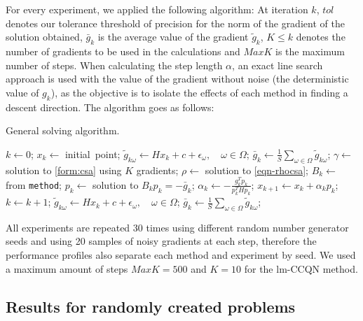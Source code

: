 \documentclass[11pt,twoside]{article}
\begin{document}
For every experiment, we applied the following algorithm: At iteration $k$, $tol$ denotes our tolerance threshold of precision for the norm of the gradient of the solution obtained, $\bar{g}_k$ is the average value of the gradient $\tilde{g}_k$, $K \le k$ denotes the number of gradients to be used in the calculations and $MaxK$ is the maximum number of steps. When calculating the step length $\alpha$, an exact line search approach is used with the value of the gradient without noise (the deterministic value of $g_k$), as the objective is to isolate the effects of each method in finding a descent direction. The algorithm goes as follows:

\begin{algorithm}
\caption{\label{alg-general} General solving algorithm.}
\begin{algorithmic}[0]%
  \State $k \gets 0$;
  \State $x_k \gets $ \mbox{initial point};
  \State $\tilde{g}_{k\omega} \gets Hx_k+c + \epsilon_\omega, \quad \omega \in
  \Omega$;
  \State $\bar{g}_k \gets \frac{1}{S}\sum_{\omega \in \Omega}\tilde{g}_{k\omega}$;
  	\State      $\gamma \gets $ solution to \eqref{form:csa} using $K$ gradients;
    \State      $\rho \gets $ solution to \eqref{eqn-rhocsa};
	\EndIf
  \State	  $B_k \gets$ from \texttt{method};
  \State      $p_k \gets $ solution to $B_k p_k = - \bar{g}_k$;
  \State      $\alpha_k \gets - \frac {g_k^T p_k}{p_k^T H p_k}$;
  \State      $x_{k+1} \gets x_k + \alpha_k p_k$;
  \State      $k \gets k + 1$;
  \State      $\tilde{g}_{k\omega} \gets Hx_k+c + \epsilon_\omega, \quad \omega \in
  \Omega$;
  \State $\bar{g}_k \gets \frac{1}{S}\sum_{\omega \in \Omega}\tilde{g}_{k\omega}$;
  \EndWhile
\end{algorithmic}
\end{algorithm}

All experiments are repeated 30 times using different random number generator seeds and using 20 samples of noisy gradients at each step, therefore the performance profiles also separate each method and experiment by seed. We used a maximum amount of steps $MaxK = 500$ and $K=10$ for the lm-CCQN method.

\subsection{Results for randomly created problems}\label{sec-smallprob}
\end{document}
